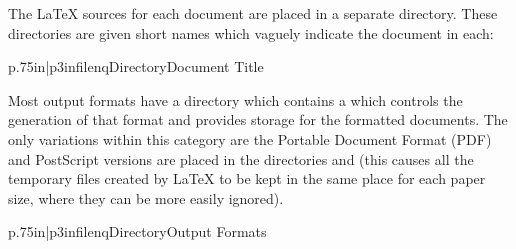 \documentclass{howto}
\begin{document}
  \begin{definitions}
        The \LaTeX{} sources for each document are placed in a
        separate directory.  These directories are given short
        names which vaguely indicate the document in each:

        \begin{tableii}{p{.75in}|p{3in}}{filenq}{Directory}{Document Title}
            {}
            {}
            {}
            {}
            {}
            {}
            {}
            {}
            {}
            {}
        \end{tableii}

        Most output formats have a directory which contains a
         which controls the generation of that format
        and provides storage for the formatted documents.  The only
        variations within this category are the Portable Document
        Format (PDF) and PostScript versions are placed in the
        directories  and  (this
        causes all the temporary files created by \LaTeX{} to be kept
        in the same place for each paper size, where they can be more
        easily ignored).

        \begin{tableii}{p{.75in}|p{3in}}{filenq}{Directory}{Output Formats}
        \end{tableii}


\end{definitions}
\end{document}
